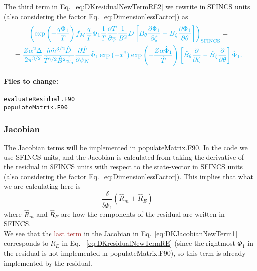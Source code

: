 \documentclass[12pt]{article}
\newcommand{\p}{\partial}
\newcommand{\remark}[1]{\textbf{\textcolor{red}{REMARK: #1}}}
\begin{document}
The third term in Eq.~\ref{eq:DKresidualNewTermRE2} we rewrite in SFINCS units (also considering the factor Eq.~\ref{eq:DimensionlessFactor}) as
\begin{multline}
\textcolor{cyan}{
\left(\exp \left(- \frac{q \Phi_1}{T}  \right) f_{M} \frac{q}{T} \Phi_1 \frac{1}{T} \frac{\p T}{\p \psi} \frac{1}{B^2} D \left[B_\theta \frac{\p \Phi_1}{\p \zeta} - B_\zeta \frac{\p \Phi_1}{\p \theta}\right]\right)_{\mathrm{SFINCS}}} = \\ = \textcolor{cyan}{
\frac{Z \alpha^2 \Delta}{2 \pi^{3/2}} \frac{\hat{n} \hat{m}^{3/2} \hat{D}}{\hat{T}^{7/2} \hat{B}^2 \hat{\psi}_a} \frac{\p \hat{T}}{\p \psi_N} \hat{\Phi}_1
\exp\left(-x^2\right) \exp \left(- \frac{Z \alpha \hat{\Phi}_1}{\hat{T}}\right) \left[\hat{B}_{\theta} \frac{\p}{\p \zeta} - \hat{B}_{\zeta} \frac{\p}{\p \theta}\right] \hat{\Phi}_1.
}
\label{eq:REterm3}
\end{multline}

\paragraph*{\textbf{Files to change:}}
\begin{verbatim}
evaluateResidual.F90
populateMatrix.F90
\end{verbatim}


\subsubsection*{Jacobian}
The Jacobian terms will be implemented in populateMatrix.F90. 
In the code we use SFINCS units, and the Jacobian is calculated from taking the derivative of the residual in SFINCS units with respect to the state-vector in SFINCS units (also considering the factor Eq.~\ref{eq:DimensionlessFactor}). This implies that what we are calculating here is 
\[
\frac{\delta}{\delta \hat{\Phi}_1} \left(\hat{R}_m + \hat{R}_E\right),
\]
where $\hat{R}_m$ and $\hat{R}_E$ are how the components of the residual are written in SFINCS. \\
We see that the \textcolor{brown}{last term} in the Jacobian in Eq.~\ref{eq:DKJacobianNewTerm1} corresponds to $R_E$ in Eq.~ \ref{eq:DKresidualNewTermRE} (since the rightmost $\Phi_1$ in the residual is not implemented in populateMatrix.F90), 
so this term is already implemented by the residual.\\
\end{document}
